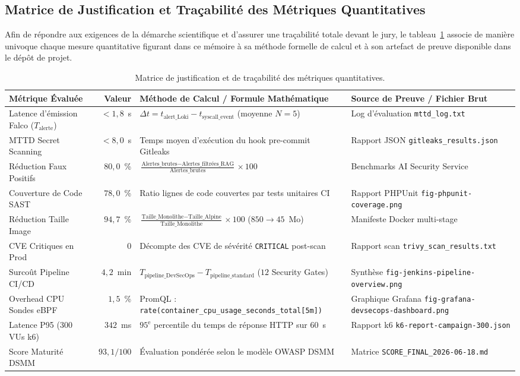 \subsection{Matrice de Justification et Traçabilité des Métriques Quantitatives}

Afin de répondre aux exigences de la démarche scientifique et d'assurer une traçabilité totale devant le jury, le tableau~\ref{tab:justification_metriques_full} associe de manière univoque chaque mesure quantitative figurant dans ce mémoire à sa méthode formelle de calcul et à son artefact de preuve disponible dans le dépôt de projet.

\begin{table}[H]
\centering
\scriptsize
\begin{tabular}{@{}p{3.2cm}r p{5.0cm} p{4.5cm}@{}}
\toprule
\textbf{Métrique Évaluée} & \textbf{Valeur} & \textbf{Méthode de Calcul / Formule Mathématique} & \textbf{Source de Preuve / Fichier Brut} \\
\midrule
Latence d'émission Falco ($T_{\text{alerte}}$) & $< 1{,}8$~s & $\Delta t = t_{\text{alert\_Loki}} - t_{\text{syscall\_event}}$ (moyenne $N=5$) & Log d'évaluation \texttt{mttd\_log.txt} \\
MTTD Secret Scanning & $< 8{,}0$~s & Temps moyen d'exécution du hook pre-commit Gitleaks & Rapport JSON \texttt{gitleaks\_results.json} \\
Réduction Faux Positifs & $80{,}0$~\% & $\frac{\text{Alertes\_brutes} - \text{Alertes\_filtrées\_RAG}}{\text{Alertes\_brutes}} \times 100$ & Benchmarks AI Security Service \\
Couverture de Code SAST & $78{,}0$~\% & Ratio lignes de code couvertes par tests unitaires CI & Rapport PHPUnit \texttt{fig-phpunit-coverage.png} \\
Réduction Taille Image & $94{,}7$~\% & $\frac{\text{Taille\_Monolithe} - \text{Taille\_Alpine}}{\text{Taille\_Monolithe}} \times 100$ ($850 \rightarrow 45$~Mo) & Manifeste Docker multi-stage \\
CVE Critiques en Prod & $0$ & Décompte des CVE de sévérité \texttt{CRITICAL} post-scan & Rapport scan \texttt{trivy\_scan\_results.txt} \\
Surcoût Pipeline CI/CD & $4{,}2$~min & $T_{\text{pipeline\_DevSecOps}} - T_{\text{pipeline\_standard}}$ ($12$ Security Gates) & Synthèse \texttt{fig-jenkins-pipeline-overview.png} \\
Overhead CPU Sondes eBPF & $1{,}5$~\% & PromQL : \texttt{rate(container\_cpu\_usage\_seconds\_total[5m])} & Graphique Grafana \texttt{fig-grafana-devsecops-dashboard.png} \\
Latence P95 (300 VUs k6) & $342$~ms & $95^{\text{e}}$ percentile du temps de réponse HTTP sur $60$~s & Rapport k6 \texttt{k6-report-campaign-300.json} \\
Score Maturité DSMM & $93{,}1 / 100$ & Évaluation pondérée selon le modèle OWASP DSMM & Matrice \texttt{SCORE\_FINAL\_2026-06-18.md} \\
\bottomrule
\end{tabular}
\caption{Matrice de justification et de traçabilité des métriques quantitatives.}
\label{tab:justification_metriques_full}
\end{table}



